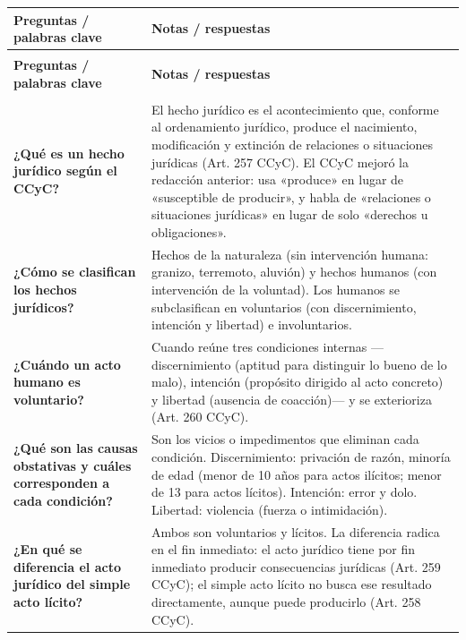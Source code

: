 \documentclass[12pt,oneside]{book}
\begin{document}
\begin{longtable}{
    >{\raggedright\arraybackslash}p{}
    >{\raggedright\arraybackslash}p{}
}
\toprule
\textbf{Preguntas / palabras clave} &
\textbf{Notas / respuestas} \\
\midrule
\endfirsthead
\multicolumn{2}{l}{\textit{Cuadro Cornell de Repaso General (continuación)}} \\
\toprule
\textbf{Preguntas / palabras clave} &
\textbf{Notas / respuestas} \\
\midrule
\endhead
\midrule
\multicolumn{2}{r}{\textit{Continúa en la página siguiente}} \\
\endfoot
\bottomrule
\endlastfoot

\textbf{¿Qué es un hecho jurídico según el CCyC?} &
El hecho jurídico es el acontecimiento que, conforme al ordenamiento jurídico, produce el nacimiento, modificación y extinción de relaciones o situaciones jurídicas (Art. 257 CCyC). El CCyC mejoró la redacción anterior: usa «produce» en lugar de «susceptible de producir», y habla de «relaciones o situaciones jurídicas» en lugar de solo «derechos u obligaciones». \\

\textbf{¿Cómo se clasifican los hechos jurídicos?} &
Hechos de la naturaleza (sin intervención humana: granizo, terremoto, aluvión) y hechos humanos (con intervención de la voluntad). Los humanos se subclasifican en voluntarios (con discernimiento, intención y libertad) e involuntarios. \\

\textbf{¿Cuándo un acto humano es voluntario?} &
Cuando reúne tres condiciones internas ---discernimiento (aptitud para distinguir lo bueno de lo malo), intención (propósito dirigido al acto concreto) y libertad (ausencia de coacción)--- y se exterioriza (Art. 260 CCyC). \\

\textbf{¿Qué son las causas obstativas y cuáles corresponden a cada condición?} &
Son los vicios o impedimentos que eliminan cada condición. Discernimiento: privación de razón, minoría de edad (menor de 10 años para actos ilícitos; menor de 13 para actos lícitos). Intención: error y dolo. Libertad: violencia (fuerza o intimidación). \\

\textbf{¿En qué se diferencia el acto jurídico del simple acto lícito?} &
Ambos son voluntarios y lícitos. La diferencia radica en el fin inmediato: el acto jurídico tiene por fin inmediato producir consecuencias jurídicas (Art. 259 CCyC); el simple acto lícito no busca ese resultado directamente, aunque puede producirlo (Art. 258 CCyC). \\


\end{longtable}
\end{document}
